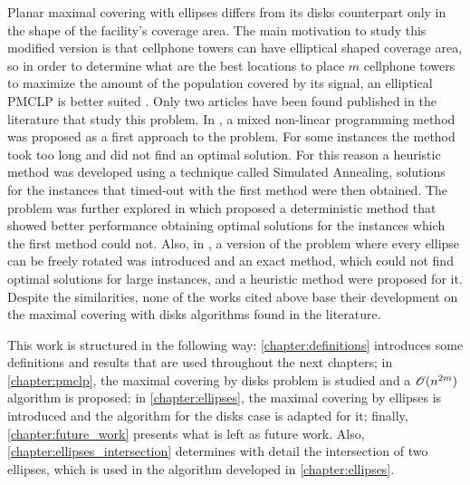 Planar maximal covering with ellipses differs from its disks counterpart only in the shape of the facility's coverage area. The main motivation to study this modified version is that cellphone towers can have elliptical shaped coverage area, so in order to determine what are the best locations to place $m$ cellphone towers to maximize the amount of the population covered by its signal, an elliptical PMCLP is better suited \cite{canbolat}. Only two articles have been found published in the literature that study this problem. In \cite{canbolat}, a mixed non-linear programming method was proposed as a first approach to the problem. For some instances the method took too long and did not find an optimal solution. For this reason a heuristic method was developed using a technique called Simulated Annealing, solutions for the instances that timed-out with the first method were then obtained. The problem was further explored in \cite{andreta} which proposed a deterministic method that showed better performance obtaining optimal solutions for the instances which the first method could not. Also, in \cite{andreta}, a version of the problem where every ellipse can be freely rotated was introduced and an exact method, which could not find optimal solutions for large instances, and a heuristic method were proposed for it. Despite the similarities, none of the works cited above base their development on the maximal covering with disks algorithms found in the literature.


This work is structured in the following way: \autoref{chapter:definitions} introduces some definitions and results that are used throughout the next chapters; in \autoref{chapter:pmclp}, the maximal covering by disks problem is studied and a $\mathscr{O}(n^{2m})$ algorithm is proposed; in \autoref{chapter:ellipses}, the maximal covering by ellipses is introduced and the algorithm for the disks case is adapted for it; finally, \autoref{chapter:future_work} presents what is left as future work. Also, \autoref{chapter:ellipses_intersection} determines with detail the intersection of two ellipses, which is used in the algorithm developed in \autoref{chapter:ellipses}.

